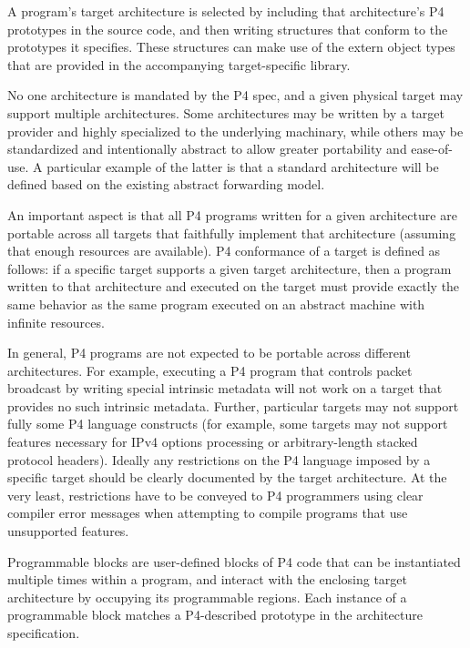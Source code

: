 A program's target architecture is selected by including that architecture's P4
prototypes in the source code, and then writing structures that conform to the
prototypes it specifies.  These structures can make use of the extern object
types that are provided in the accompanying target-specific library.

No one architecture is mandated by the P4 spec, and a given physical target may 
support multiple architectures.  Some architectures may be written by a target
provider and highly specialized to the underlying machinary, while others may
be standardized and intentionally abstract to allow greater portability and
ease-of-use.  A particular example of the latter is that a standard
architecture will be defined based on the existing abstract forwarding model.

An important aspect is that all P4 programs written for a given architecture
are portable across all targets that faithfully implement that architecture
(assuming that enough resources are available).  P4 conformance of a target is
defined as follows: if a specific target supports a given target architecture,
then a program written to that architecture and executed on the target must
provide exactly the same behavior as the same program executed on an abstract
machine with infinite resources.

In general, P4 programs are not expected to be portable across different
architectures.  For example, executing a P4 program that controls packet
broadcast by writing special intrinsic metadata will not work on a target that
provides no such intrinsic metadata.  Further, particular targets may not
support fully some P4 language constructs (for example, some targets may not
support features necessary for IPv4 options processing or arbitrary-length
stacked protocol headers).  Ideally any restrictions on the P4 language
imposed by a specific target should be clearly documented by the target
architecture.  At the very least, restrictions have to be conveyed to P4
programmers using clear compiler error messages when attempting to compile
programs that use unsupported features.


Programmable blocks are user-defined blocks of P4 code that can be
instantiated multiple times within a program, and interact with the enclosing
target architecture by occupying its programmable regions.  Each instance
of a programmable block matches a P4-described prototype in the
architecture specification.


